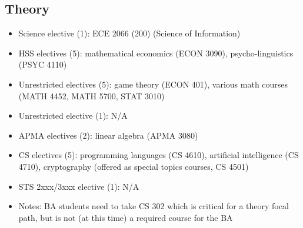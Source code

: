 \documentclass[10pt,letter]{book}
\newenvironment{itemlist}{
\begin{itemize}
\setlength{\itemsep}{0pt}
\setlength{\parskip}{0pt}}
{\end{itemize}}
\begin{document}
\subsection{Theory}
\begin{itemlist}
\item Science elective (1): ECE 2066 (200) (Science of Information)
\item HSS electives (5): mathematical economics (ECON 3090),
  psycho-linguistics (PSYC 4110)
\item Unrestricted electives (5): game theory (ECON 401), various math
  courses (MATH 4452, MATH 5700, STAT 3010)
\item Unrestricted elective (1): N/A
\item APMA electives (2): linear algebra (APMA 3080)
\item CS electives (5): programming languages (CS 4610), artificial
  intelligence (CS 4710), cryptography (offered as special topics
  courses, CS 4501)
\item STS 2xxx/3xxx elective (1): N/A
\item Notes: BA students need to take CS 302 which is critical for a
  theory focal path, but is not (at this time) a required course for
  the BA
\end{itemlist}
\end{document}
